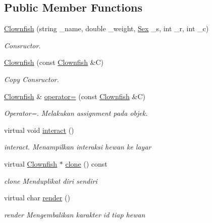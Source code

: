 \subsection*{Public Member Functions}
\begin{DoxyCompactItemize}
\item 
\hyperlink{classClownfish_a77d6bd74aea35e208436e32b88ae67da}{Clownfish} (string \+\_\+name, double \+\_\+weight, \hyperlink{sex_8h_a2633cb393c68bb2ee8080db58fb7ba93}{Sex} \+\_\+s, int \+\_\+r, int \+\_\+c)
\begin{DoxyCompactList}\small\item\em Consructor. \end{DoxyCompactList}\item 
\hyperlink{classClownfish_ac3b7c19260b48e42dc72df3212c43685}{Clownfish} (const \hyperlink{classClownfish}{Clownfish} \&C)
\begin{DoxyCompactList}\small\item\em Copy Consructor. \end{DoxyCompactList}\item 
\hyperlink{classClownfish}{Clownfish} \& \hyperlink{classClownfish_a4d2b9efc9a7001f17bb6433c7f12a20b}{operator=} (const \hyperlink{classClownfish}{Clownfish} \&C)
\begin{DoxyCompactList}\small\item\em Operator=. Melakukan assignment pada objek. \end{DoxyCompactList}\item 
virtual void \hyperlink{classClownfish_a7c4cae7b0676de4ba55273db65d929f5}{interact} ()
\begin{DoxyCompactList}\small\item\em interact. Menampilkan interaksi hewan ke layar \end{DoxyCompactList}\item 
virtual \hyperlink{classClownfish}{Clownfish} $\ast$ \hyperlink{classClownfish_aa4ee84fc66ce7a63aa8a8d64abb26de5}{clone} () const 
\begin{DoxyCompactList}\small\item\em clone Menduplikat diri sendiri \end{DoxyCompactList}\item 
virtual char \hyperlink{classClownfish_a14417b8b2f3a9273eb9fedef9bbe9e92}{render} ()
\begin{DoxyCompactList}\small\item\em render Mengembalikan karakter id tiap hewan \end{DoxyCompactList}\item 

\end{DoxyCompactItemize}
